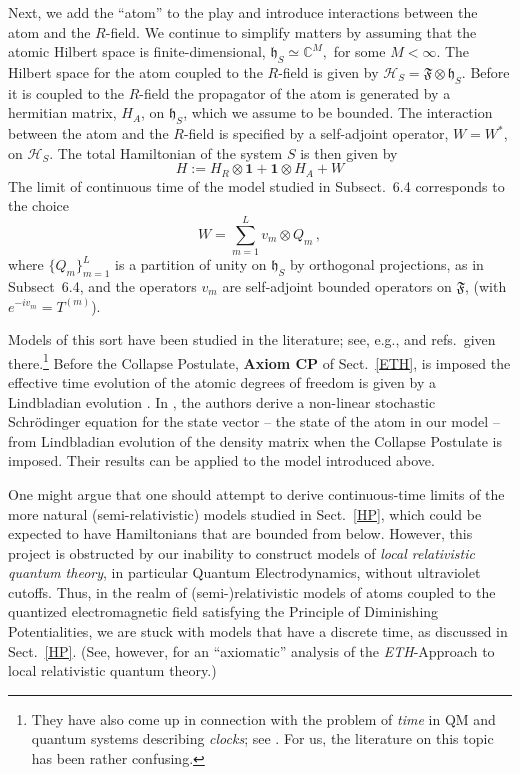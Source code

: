 \documentclass[12pt]{article}
\begin{document}
{Next, we add the ``atom'' to the play and introduce interactions between the atom and the $R$-field. We continue to simplify matters by assuming that the atomic Hilbert space is finite-dimensional, $\mathfrak{h}_S\simeq \mathbb{C}^{M},$ for some $M< \infty$. The Hilbert space for the atom coupled to the $R$-field is given by $\mathcal{H}_S = \mathfrak{F}\otimes \mathfrak{h}_S$. Before it is coupled to the $R$-field the propagator of the atom is generated by a hermitian matrix, $H_A$, on $\mathfrak{h}_S$, which we assume to be bounded. The interaction between the atom and the $R$-field is specified by a self-adjoint operator, $W=W^{*}$, 
on $\mathcal{H}_S$. The total Hamiltonian of the system $S$ is then given by
\begin{equation}\label{Ham}
H:= H_R\otimes \mathbf{1} + \mathbf{1}\otimes H_A + W
\end{equation}
The limit of continuous time of the model studied in Subsect.~6.4 corresponds to the choice
$$W= \sum_{m=1}^{L} v_m\otimes Q_m\,,$$
where $\big\{Q_m\big\}_{m=1}^{L}$ is a partition of unity on $\mathfrak{h}_S$ by orthogonal projections, as in Subsect~6.4, and the operators $v_m$ are self-adjoint bounded operators on $\mathfrak{F}$, (with $e^{-iv_m} = T^{(m)}$). 

Models of this sort have been studied in the literature; see, e.g., \cite{H-P, FGH} and refs.~given there.\footnote{They have also come up in connection with the problem of \textit{time} in QM and quantum systems describing \textit{clocks}; see \cite{clocks}. For us, the literature on this topic has been rather confusing.} Before the Collapse Postulate, {\bf{Axiom CP}} of Sect.~\ref{ETH}, is imposed the effective time evolution of the atomic degrees of freedom is given by a Lindbladian evolution \cite{GKS, Lindblad}. In \cite{Bassi}, the authors derive a non-linear stochastic Schr\"odinger equation for the state vector -- the state of the atom in our model -- from Lindbladian evolution of the density matrix when the Collapse Postulate is imposed. Their results can be applied to the model introduced above.

One might argue that one should attempt to derive continuous-time limits of the more natural (semi-relativistic) models studied in Sect.~\ref{HP}, which could be expected to have Hamiltonians that are bounded from below. However, this project is obstructed by our inability to construct models of \textit{local relativistic quantum theory}, in particular Quantum Electrodynamics, without ultraviolet cutoffs. Thus, in the realm of (semi-)relativistic models of atoms coupled to the quantized electromagnetic field satisfying the Principle of Diminishing Potentialities, we are stuck with models that have a discrete time, as discussed in Sect.~\ref{HP}. (See, however, \cite{Fr2} for an ``axiomatic'' analysis of the \textit{ETH}-Approach to local relativistic quantum theory.)

}
\end{document}
